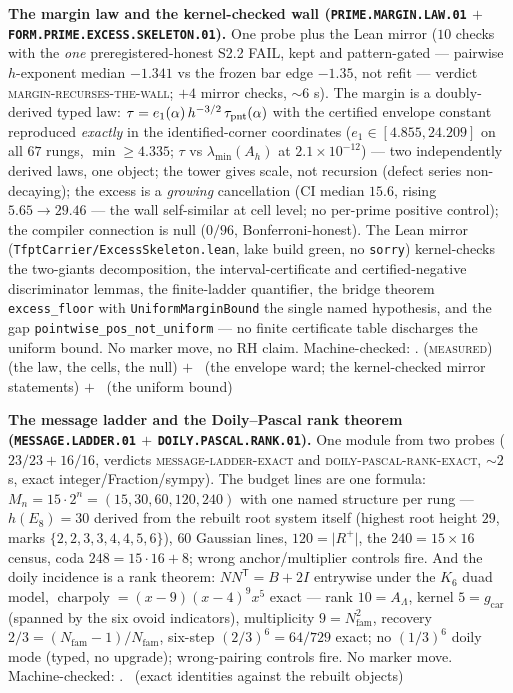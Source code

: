 \documentclass[11pt,a4paper]{article}
\newcommand{\gcar}{g_{\mathrm{car}}}
\newcommand{\Nfam}{N_{\mathrm{fam}}}
\theoremstyle{definition}
\begin{document}
\par\smallskip\noindent\textbf{The margin law and the
kernel-checked wall (\texttt{PRIME.MARGIN.LAW.01} $+$
\texttt{FORM.PRIME.\allowbreak EXCESS.\allowbreak SKELETON.01}).}
One probe plus the Lean mirror ($10$ checks with the \emph{one}
preregistered-honest S2.2 FAIL, kept and pattern-gated ---
pairwise $h$-exponent median $-1.341$ vs the frozen bar edge
$-1.35$, not refit --- verdict
\textsc{margin-recurses-the-wall}; $+4$ mirror checks,
$\sim6$ s).  The margin is a doubly-derived typed law:
$\tau = e_1(\alpha)\, h^{-3/2}\, \tau_{\rm pnt}(\alpha)$ with the
certified envelope constant reproduced \emph{exactly} in the
identified-corner coordinates ($e_1 \in [4.855, 24.209]$ on all
$67$ rungs, $\min \ge 4.335$; $\tau$ vs $\lambda_{\min}(A_h)$ at
$2.1\times10^{-12}$) --- two independently derived laws, one
object; the tower gives scale, not recursion (defect series
non-decaying); the excess is a \emph{growing} cancellation (CI
median $15.6$, rising $5.65 \to 29.46$ --- the wall self-similar
at cell level; no per-prime positive control); the compiler
connection is null ($0/96$, Bonferroni-honest).  The Lean mirror
(\texttt{TfptCarrier/ExcessSkeleton.lean}, lake build green, no
\texttt{sorry}) kernel-checks the two-giants decomposition, the
interval-certificate and certified-negative discriminator lemmas,
the finite-ladder quantifier, the bridge theorem
\texttt{excess\_floor} with \texttt{UniformMarginBound} the
single named hypothesis, and the gap
\texttt{pointwise\_pos\_not\_uniform} --- no finite certificate
table discharges the uniform bound.  No marker move, no RH claim.
Machine-checked: .
(\textsc{measured}) (the law, the cells, the null) $+$ \mE\ (the
envelope ward; the kernel-checked mirror statements) $+$ \mO\
(the uniform bound)
\par\smallskip

\par\smallskip\noindent\textbf{The message ladder and the
Doily--Pascal rank theorem (\texttt{MESSAGE.LADDER.01} $+$
\texttt{DOILY.PASCAL.RANK.01}).}
One module from two probes ($23/23 + 16/16$, verdicts
\textsc{message-ladder-exact} and
\textsc{doily-pascal-rank-exact}, ${\sim}2$ s, exact
integer/Fraction/sympy).  The budget lines are one formula:
$M_n = 15\cdot2^n = (15, 30, 60, 120, 240)$ with one named
structure per rung --- $h(E_8) = 30$ derived from the rebuilt
root system itself (highest root height $29$, marks
$\{2,2,3,3,4,4,5,6\}$), $60$ Gaussian lines, $120 = \lvert
R^+\rvert$, the $240 = 15\times16$ census, coda $248 = 15\cdot16
+ 8$; wrong anchor/multiplier controls fire.  And the doily
incidence is a rank theorem: $NN^{\mathsf T} = B + 2I$ entrywise
under the $K_6$ duad model, $\operatorname{charpoly} =
(x-9)(x-4)^9x^5$ exact --- rank $10 = A_\Lambda$, kernel
$5 = \gcar$ (spanned by the six ovoid indicators), multiplicity
$9 = \Nfam^2$, recovery $2/3 = (\Nfam-1)/\Nfam$, six-step
$(2/3)^6 = 64/729$ exact; no $(1/3)^6$ doily mode (typed, no
upgrade); wrong-pairing controls fire.  No marker move.
Machine-checked: .
\mE\ (exact identities against the rebuilt objects)
\par\smallskip
\end{document}
